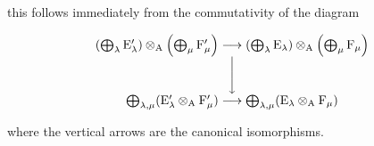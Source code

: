 this follows immediately from the commutativity of the diagram

\[
\begin{array}{c} \left(\bigoplus_ {\lambda} \mathrm{E} _ {\lambda} ^ {\prime}\right) \otimes_ {\mathrm{A}} \left(\bigoplus_ {\mu} \mathrm{F} _ {\mu} ^ {\prime}\right) \longrightarrow \left(\bigoplus_ {\lambda} \mathrm{E} _ {\lambda}\right) \otimes_ {\mathrm{A}} \left(\bigoplus_ {\mu} \mathrm{F} _ {\mu}\right) \\ \Biggl \downarrow \\ \bigoplus_ {\lambda , \mu} (\mathrm{E} _ {\lambda} ^ {\prime} \otimes_ {\mathrm{A}} \mathrm{F} _ {\mu} ^ {\prime}) \longrightarrow \bigoplus_ {\lambda , \mu} (\mathrm{E} _ {\lambda} \otimes_ {\mathrm{A}} \mathrm{F} _ {\mu}) \end{array}
\]

where the vertical arrows are the canonical isomorphisms.

